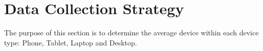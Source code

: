 \documentclass[conference]{IEEEtran}
\begin{document}
\section{Data Collection Strategy}


The purpose of this section is to determine the average device within
each device type: Phone, Tablet, Laptop and Desktop.




\end{document}
